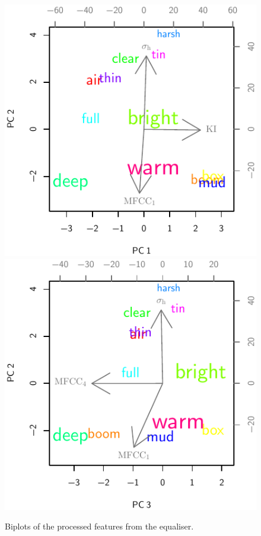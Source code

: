			\begin{figure}[h!]
				\centering
				\subfloat
				{
					\includegraphics{chapter4/Images/EqualiserProcessedCentroidsPCA1-2.pdf}
					\label{fig:EqualiserProcessedCentroidsPCA1-2}
				}
				\quad
				\subfloat
				{
					\includegraphics{chapter4/Images/EqualiserProcessedCentroidsPCA3-2.pdf}
					\label{fig:EqualiserProcessedCentroidsPCA3-2}
				}
				\caption{Biplots of the processed features from the equaliser.}
				\label{fig:EqualiserProcessedCentroidsPCAs}
			\end{figure}

